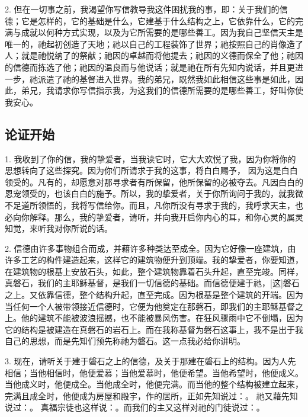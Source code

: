 2. 但在一切事之前，我渴望你写信教导我这件困扰我的事，即：关于我们的信德；它是怎样的，它的基础是什么，它建基于什么结构之上，它依靠什么，它的完满与成就以何种方式实现，以及为它所需要的是哪些善工。因为我自己坚信天主是唯一的，祂起初创造了天地；祂以自己的工程装饰了世界；祂按照自己的肖像造了人；就是祂悦纳了的祭献；祂因的卓越而将他提去；祂因的义德而保全了他；祂因的信德而拣选了他；祂因的温良而与他说话；就是祂在所有先知内说话，并且更进一步，祂派遣了祂的基督进入世界。我的弟兄，既然我如此相信这些事是如此，因此，弟兄，我请求你写信指示我，为这我们的信德所需要的是哪些善工，好叫你使我安心。\par


\subsection{论证开始}

1. 我收到了你的信，我的挚爱者，当我读它时，它大大欢悦了我，因为你将你的思想转向了这些探究。因为你们所请求于我的这事，将白白赐予， 因为这是白白领受的。凡有的，却愿意对那寻求者有所保留，他所保留的必被夺去。凡因白白的恩宠领受的，也该白白的施予。所以，我的挚爱者，关于你所询问于我的，就我微不足道所领悟的，我将写信给你。而且，凡你所没有寻求于我的，我呼求天主，也必向你解释。那么，我的挚爱者，请听，并向我开启你内心的耳，和你心灵的属灵知觉，来听我对你所说的话。\par

2. 信德由许多事物组合而成，并藉许多种类达至成全。因为它好像一座建筑，由许多工艺的构件建造起来，这样它的建筑物便升到顶端。我的挚爱者，你要知道，在建筑物的根基上安放石头，如此，整个建筑物靠着石头升起，直至完竣。同样，真磐石，我们的主耶稣基督，是我们一切信德的基础。而信德便建于祂，[这]磐石之上。又依靠信德，整个结构升起，直至完成。因为根基是整个建筑的开端。因为当任何一个人被带领接近信德时，它便为他奠定在那磐石，即我们的主耶稣基督之上。他的建筑不能被波浪摇撼，也不能被暴风伤害。在狂风骤雨中它不倒塌，因为它的结构是被建造在真磐石的岩石上。而在我称基督为磐石这事上，我不是出于我自己的思想，而是先知们预先称祂为磐石。这一点我必给你讲明。\par

3. 现在，请听关于建于磐石之上的信德，及关于那建在磐石上的结构。因为人先相信；当他相信时，他便爱慕；当他爱慕时，他便希望。当他希望时，他便成义。当他成义时，他便成全。当他成全时，他便完满。而当他的整个结构被建立起来，完满且成全时，他便成为房屋和殿宇，作的居所，正如先知说过：。 祂又藉先知说过：。 真福宗徒也这样说：。而我们的主又这样对祂的门徒说过：。\par

